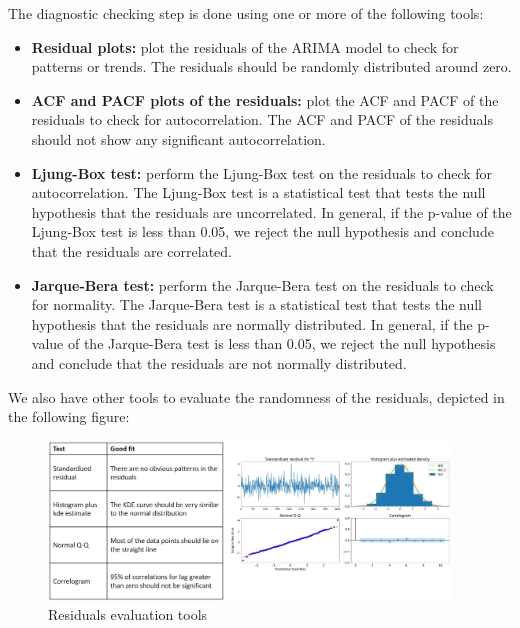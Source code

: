 The diagnostic checking step is done using one or more of the following tools:

\begin{itemize}
    \item \textbf{Residual plots:} plot the residuals of the ARIMA model to check for
    patterns or trends. The residuals should be randomly distributed around zero.

    \item \textbf{ACF and PACF plots of the residuals:} plot the ACF and PACF of the
    residuals to check for autocorrelation. The ACF and PACF of the residuals should
    not show any significant autocorrelation.

    \item \textbf{Ljung-Box test:} perform the Ljung-Box test on the residuals to check
    for autocorrelation. The Ljung-Box test is a statistical test that tests the null
    hypothesis that the residuals are uncorrelated. In general, if the p-value of the
    Ljung-Box test is less than 0.05, we reject the null hypothesis and conclude that
    the residuals are correlated.

    \item \textbf{Jarque-Bera test:} perform the Jarque-Bera test on the residuals to
    check for normality. The Jarque-Bera test is a statistical test that tests the null
    hypothesis that the residuals are normally distributed. In general, if the p-value
    of the Jarque-Bera test is less than 0.05, we reject the null hypothesis and conclude
    that the residuals are not normally distributed.
\end{itemize}

We also have other tools to evaluate the randomness of the residuals, depicted in the
following figure:

\begin{figure}[H]
    \centering
    \includegraphics[width=0.95\textwidth]{figures/residuals.png}
    \caption{Residuals evaluation tools}
    \label{fig:residuals}
\end{figure}

